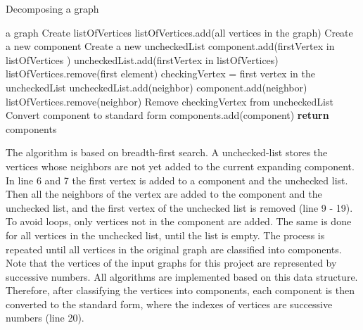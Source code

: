\documentclass[a4paper]{report}
\begin{document}
		\begin{algorithm}
			\caption{Decomposing a graph}
			\label{alg:decompose}
			\begin{algorithmic}[1]
				\REQUIRE a graph
				\STATE Create listOfVertices 
				\STATE listOfVertices.add(all vertices in the graph)
				\STATE Create a new component
				\STATE Create a new uncheckedList
				\STATE component.add(firstVertex in listOfVertices )
				\STATE uncheckedList.add(firstVertex in listOfVertices)
				\STATE listOfVertices.remove(first element)
				\STATE checkingVertex = first vertex in the uncheckedList
				\STATE uncheckedList.add(neighbor)
				\STATE component.add(neighbor)
				\ENDIF
				\STATE listOfVertices.remove(neighbor)
				\ENDFOR
				\STATE Remove checkingVertex from uncheckedList
				\ENDWHILE
				\STATE Convert component to standard form
				\STATE components.add(component)
				\ENDWHILE
				\STATE \textbf{return} components
				
			\end{algorithmic}
		\end{algorithm}
		The algorithm is based on breadth-first search. A unchecked-list stores the vertices whose neighbors are not yet added to the current expanding component. In line 6 and 7 the first vertex is added to a component and the unchecked list. Then all the neighbors of the vertex are added to the component and the unchecked list, and the first vertex of the unchecked list is removed (line 9 - 19). To avoid loops, only vertices not in the component are added. The same is done for all vertices in the unchecked list, until the list is empty. The process is repeated until all vertices in the original graph are classified into components.\\
		Note that the vertices of the input graphs for this project are represented by successive numbers. All algorithms are implemented based on this data structure. Therefore, after classifying the vertices into components, each component is then converted to the standard form, where the indexes of vertices are successive numbers (line 20).
		
\end{document}
